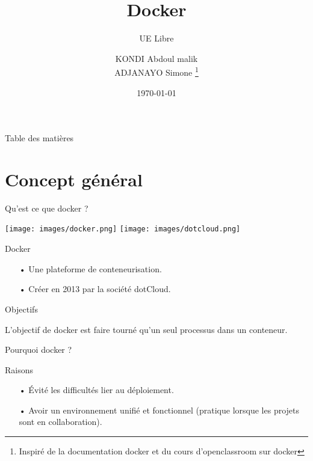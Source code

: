 \documentclass[a4paper]{beamer}
\title{Docker}
\subtitle[DAP]{UE Libre}
\institute{IFNTI L3}
\author{KONDI Abdoul malik \\ ADJANAYO Simone \thanks{Inspiré de la documentation docker et du cours d'openclassroom sur docker}}
\date{\today}
\begin{document}
{
\begin{frame}[plain]
	\titlepage
\end{frame}
}

\begin{frame}{Table des matières}
	\tableofcontents
\end{frame}

{

\section{Concept général}

\begin{frame}{Qu'est ce que docker ?}
\begin{center}
\texttt{[image: images/docker.png]}
\texttt{[image: images/dotcloud.png]}
\end{center}
\begin{block}{Docker}
\begin{itemize}
\item[•] Une plateforme de conteneurisation.
\item[•] Créer en 2013 par la société dotCloud.
\end{itemize}
\end{block}
\end{frame}

\begin{frame}{Objectifs}
\begin{block}{L'objectif de docker}
est faire tourné qu'un seul processus dans un conteneur.
\end{block}
\end{frame}

\begin{frame}{Pourquoi docker ?}
\begin{block}{Raisons}
\begin{itemize}
\item[•] Évité les difficultés lier au déploiement.
\item[•] Avoir un environnement unifié et fonctionnel (pratique lorsque les projets sont en collaboration).
\end{itemize}
\end{block}
\end{frame}

}
\end{document}
